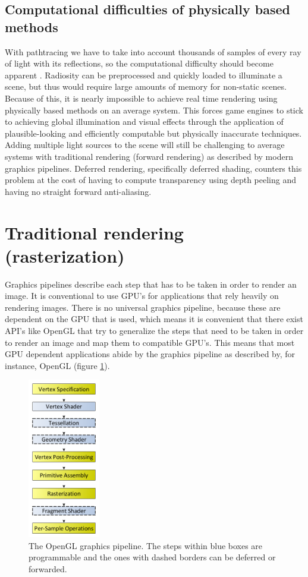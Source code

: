 \documentclass{ACGSeminar}
\begin{document}
	\subsection{Computational difficulties of physically based methods}
	With pathtracing we have to take into account thousands of samples of every ray of light with its reflections, so the computational difficulty should become apparent \cite{DST}. Radiosity can be preprocessed and quickly loaded to illuminate a scene, but thus would require large amounts of memory for non-static scenes. Because of this, it is nearly impossible to achieve real time rendering using physically based methods on an average system. This forces game engines to stick to achieving global illumination and visual effects through the application of plausible-looking and efficiently computable but physically inaccurate techniques. Adding multiple light sources to the scene will still be challenging to average systems with traditional rendering (forward rendering) as described by modern graphics pipelines. Deferred rendering, specifically deferred shading, counters this problem at the cost of having to compute transparency using depth peeling and having no straight forward anti-aliasing.

\section{Traditional rendering (rasterization)}
	Graphics pipelines describe each step that has to be taken in order to render an image. It is conventional to use GPU's for applications that rely heavily on rendering images. There is no universal graphics pipeline, because these are dependent on the GPU that is used, which means it is convenient that there exist API's like OpenGL that try to generalize the steps that need to be taken in order to render an image and map them to compatible GPU's. This means that most GPU dependent applications abide by the graphics pipeline as described by, for instance, OpenGL (figure \ref{fig:graphics_pipeline}).
	\begin{figure}[htb!]%
	\begin{center}%
		\includegraphics[height=7cm]{img/graphics_pipeline.png}
	\end{center}%
	\caption{The OpenGL graphics pipeline. The steps within blue boxes are programmable and the ones with dashed borders can be deferred or forwarded.}%
	\label{fig:graphics_pipeline}%
	\end{figure}%
\end{document}

